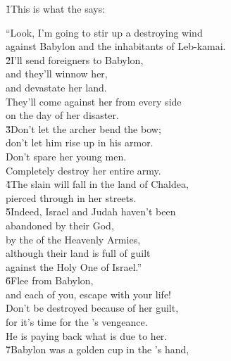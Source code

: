 \v{1}This is what the  says:

\begin{poetry}
\poeml ``Look, I'm going to stir up a destroying wind \\
\poemll    against Babylon and the inhabitants of Leb-kamai. \\
\poeml \v{2}I'll send foreigners to Babylon, \\
\poemll    and they'll winnow her, \\
\poemlll       and devastate her land. \\
\poeml They'll come against her from every side \\
\poemll    on the day of her disaster. \\
\poeml \v{3}Don't let the archer bend the bow; \\
\poemll    don't let him rise up in his armor. \\
\poeml Don't spare her young men. \\
\poemll    Completely destroy her entire army. \\
\poeml \v{4}The slain will fall in the land of Chaldea, \\
\poemll    pierced through in her streets. \\
\poeml \v{5}Indeed, Israel and Judah haven't been \\
\poemll    abandoned by their God, \\
\poeml by the  of the Heavenly Armies, \\
\poemll    although their land is full of guilt \\
\poemlll       against the Holy One of Israel.'' \\
\poeml \v{6}Flee from Babylon, \\
\poemll    and each of you, escape with your life! \\
\poeml Don't be destroyed because of her guilt, \\
\poemll    for it's time for the 's vengeance. \\
\poemlll       He is paying back what is due to her. \\
\poeml \v{7}Babylon was a golden cup in the 's hand, \\

\end{poetry}
